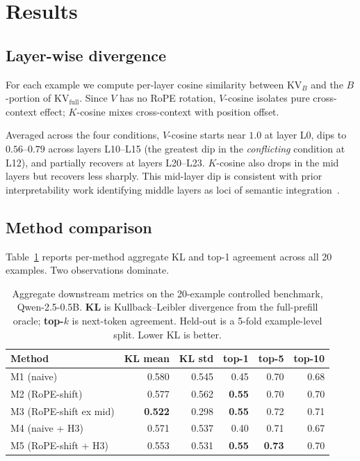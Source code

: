 \documentclass[11pt]{article}
\begin{document}
\section{Results}

\subsection{Layer-wise divergence}\label{sec:layers}

For each example we compute per-layer cosine similarity between $\mathrm{KV}_B$ and the $B$-portion of $\mathrm{KV}_{\text{full}}$. Since $V$ has no RoPE rotation, $V$-cosine isolates pure cross-context effect; $K$-cosine mixes cross-context with position offset.

Averaged across the four conditions, $V$-cosine starts near $1.0$ at layer L0, dips to $0.56$--$0.79$ across layers L10--L15 (the greatest dip in the \emph{conflicting} condition at L12), and partially recovers at layers L20--L23. $K$-cosine also drops in the mid layers but recovers less sharply. This mid-layer dip is consistent with prior interpretability work identifying middle layers as loci of semantic integration~\citep{elhage2022superposition}.

\subsection{Method comparison}\label{sec:m2}

Table~\ref{tab:main} reports per-method aggregate KL and top-1 agreement across all 20 examples. Two observations dominate.

\begin{table}[t]
\centering
\caption{Aggregate downstream metrics on the 20-example controlled benchmark, Qwen-2.5-0.5B. \textbf{KL} is Kullback--Leibler divergence from the full-prefill oracle; \textbf{top-$k$} is next-token agreement. Held-out is a 5-fold example-level split. Lower KL is better.}
\label{tab:main}
\begin{tabular}{lrrrrr}
\toprule
Method & KL mean & KL std & top-1 & top-5 & top-10 \\
\midrule
M1 (naive)              & 0.580 & 0.545 & 0.45 & 0.70 & 0.68 \\
M2 (RoPE-shift)          & 0.577 & 0.562 & \textbf{0.55} & 0.70 & 0.70 \\
M3 (RoPE-shift ex mid)   & \textbf{0.522} & 0.298 & \textbf{0.55} & 0.72 & 0.71 \\
M4 (naive + H3)          & 0.571 & 0.537 & 0.40 & 0.71 & 0.67 \\
M5 (RoPE-shift + H3)     & 0.553 & 0.531 & \textbf{0.55} & \textbf{0.73} & 0.70 \\
\bottomrule
\end{tabular}
\end{table}
\end{document}
